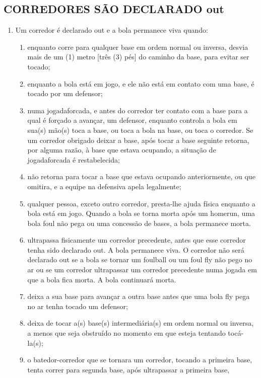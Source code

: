 \subsection{CORREDORES SÃO DECLARADO \gls{out}}

\begin{enumerate}[label=(\alph*)]
	\item   Um corredor é declarado \gls{out} e a bola permanece viva quando:

	\begin{enumerate}[label=\roman*.]
		\item enquanto corre para qualquer base em ordem normal ou inversa, desvia mais de um (1) metro [três (3) pés] do caminho da base, para evitar ser tocado;
		\item  enquanto a bola está em jogo, e ele não está em contato com uma base, é tocado por um defensor;
		\item  numa \gls{jogadaforcada}, e antes do corredor ter contato com a base para a qual é forçado a avançar, um defensor, enquanto controla a bola em sua(s) mão(s) toca a base, ou toca a bola na base, ou toca o corredor. Se um corredor obrigado deixar a base, após tocar a base seguinte retorna, por alguma razão, à base que estava ocupando, a situação de \gls{jogadaforcada} é restabelecida;
		\item  não retorna para tocar a base que estava ocupando anteriormente, ou que omitira, e a equipe na defensiva apela legalmente;
		\item qualquer pessoa, exceto outro corredor, presta-lhe ajuda física enquanto a bola está em jogo. Quando a bola se torna morta após um
		\gls{homerun}, uma bola \gls{foul} não pega ou uma concessão de bases, a bola permanece morta.
		\item  ultrapassa fisicamente um corredor precedente, antes que esse corredor tenha sido declarado \gls{out}. A bola permanece viva. O corredor  não será declarado \gls{out} se a bola se tornar um \gls{foulball} ou um \gls{foul fly} não pego no ar ou se um corredor ultrapassar um corredor precedente numa jogada em que a bola fica morta. A bola continuará morta.
		\item  deixa a sua base para avançar a outra base antes que uma bola \gls{fly} pega no ar tenha tocado um defensor;
		\item deixa de tocar a(s) base(s) intermediária(s) em ordem normal ou inversa, a menos que seja obstruído no momento em que esteja tentando tocá-la(s);
		\item  o batedor-corredor que se tornara um corredor, tocando a primeira base, tenta correr para segunda base, após ultrapassar a primeira base,

\end{enumerate}
\end{enumerate}
